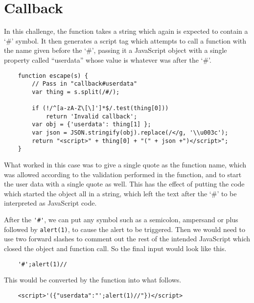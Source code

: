 \documentclass{article}
\begin{document}
\section{Callback}

In this challenge, the function takes a string which again is expected to contain a `\#' symbol. It then generates a script tag which attempts to call a function with the name given before the `\#', passing it a JavaScript object with a single property called ``userdata'' whose value is whatever was after the `\#'.

\begin{verbatim}
	function escape(s) {
	    // Pass in "callback#userdata"
	    var thing = s.split(/#/);

	    if (!/^[a-zA-Z\[\]']*$/.test(thing[0]))
	        return 'Invalid callback';
	    var obj = {'userdata': thing[1] };
	    var json = JSON.stringify(obj).replace(/</g, '\\u003c');
	    return "<script>" + thing[0] + "(" + json +")</script>";
	}
\end{verbatim}

What worked in this case was to give a single quote as the function name, which was allowed according to the validation performed in the function, and to start the user data with a single quote as well. This has the effect of putting the code which started the object all in a string, which left the text after the `\#' to be interpreted as JavaScript code.

After the \verb`'#'`, we can put any symbol such as a semicolon, ampersand or plus followed by \verb`alert(1)`, to cause the alert to be triggered. Then we would need to use two forward slashes to comment out the rest of the intended JavaScript which closed the object and function call. So the final input would look like this.

\begin{verbatim}
	'#';alert(1)//
\end{verbatim}

This would be converted by the function into what follows.

\begin{verbatim}
	<script>'({"userdata":"';alert(1)//"})</script>
\end{verbatim}
\end{document}
